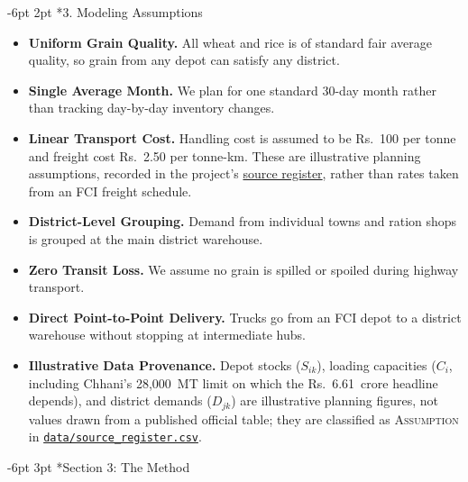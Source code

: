 \documentclass[10pt,a4paper]{article}
\makeatletter
\renewcommand\section{\@startsection {section}{1}{\z@}%
                                   {-6pt \@plus -2pt \@minus -2pt}%
                                   {3pt \@plus 1pt}%
                                   {\normalfont\Large\bfseries}}
\renewcommand\subsection{\@startsection{subsection}{2}{\z@}%
                                     {-6pt \@plus -2pt \@minus -1pt}%
                                     {2pt \@plus 1pt}%
                                     {\normalfont\large\bfseries}}
\makeatother
\begin{document}
\subsection*{3. Modeling Assumptions}
\begin{itemize}\setlength{\itemsep}{0.5pt}\setlength{\parskip}{0pt}\small
\item \textbf{Uniform Grain Quality.} All wheat and rice is of standard fair average quality, so grain from any depot can satisfy any district.
\item \textbf{Single Average Month.} We plan for one standard 30-day month rather than tracking day-by-day inventory changes.
\item \textbf{Linear Transport Cost.} Handling cost is assumed to be Rs.~100 per tonne and freight cost Rs.~2.50 per tonne-km. These are illustrative planning assumptions, recorded in the project's \href{https://github.com/abhitejj/CE637-Infra_Project/blob/main/data/source_register.csv}{source register}, rather than rates taken from an FCI freight schedule.
\item \textbf{District-Level Grouping.} Demand from individual towns and ration shops is grouped at the main district warehouse.
\item \textbf{Zero Transit Loss.} We assume no grain is spilled or spoiled during highway transport.
\item \textbf{Direct Point-to-Point Delivery.} Trucks go from an FCI depot to a district warehouse without stopping at intermediate hubs.
\item \textbf{Illustrative Data Provenance.} Depot stocks ($S_{ik}$), loading capacities ($C_i$, including Chhani's 28,000~MT limit on which the Rs.~6.61~crore headline depends), and district demands ($D_{jk}$) are illustrative planning figures, not values drawn from a published official table; they are classified as \textsc{Assumption} in \href{https://github.com/abhitejj/CE637-Infra_Project/blob/main/data/source_register.csv}{\texttt{data/source\_register.csv}}.
\end{itemize}

\newpage

\section*{Section 3: The Method}
\end{document}
